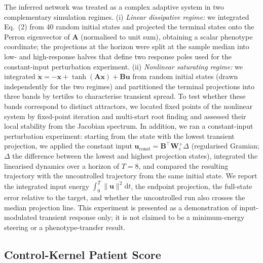 \documentclass[12pt]{article}
\begin{document}
The inferred network was treated as a complex adaptive system in two
complementary simulation regimes. (i) \emph{Linear dissipative regime:} we
integrated Eq.~(2) from 40 random initial states and projected the terminal
states onto the Perron eigenvector of $\mathbf{A}$ (normalised to unit
sum), obtaining a scalar phenotype coordinate; the projections at the
horizon were split at the sample median into low- and high-response halves
that define two response poles used for the constant-input perturbation
experiment. (ii) \emph{Nonlinear saturating regime:} we integrated
$\dot{\mathbf{x}} = -\mathbf{x} + \tanh(\mathbf{A}\mathbf{x}) +
\mathbf{B}\mathbf{u}$ from random initial states (drawn independently for
the two regimes) and partitioned the
terminal projections into three bands by tertiles to characterise transient
spread. To test whether these bands correspond to distinct attractors, we
located fixed points of the nonlinear system by fixed-point iteration and
multi-start root finding and assessed their local stability from the
Jacobian spectrum. In addition, we ran a constant-input perturbation
experiment: starting from the state with the lowest transient projection,
we applied the constant input $\mathbf{u}_{\mathrm{const}} =
\mathbf{B}^{\top}\mathbf{W}_c^{+}\Delta$ (regularised Gramian; $\Delta$
the difference between the lowest and highest projection states), integrated
the linearised dynamics over a horizon of $T = 8$, and compared the
resulting trajectory with the uncontrolled trajectory from the same initial
state. We report the integrated input energy $\int_0^T \|\mathbf{u}\|^2
\mathrm{d}t$, the endpoint projection, the full-state error relative to the
target, and whether the uncontrolled run also crosses the median projection
line. This experiment is presented as a demonstration of input-modulated
transient response only; it is not claimed to be a minimum-energy steering
or a phenotype-transfer result.

\subsection{Control-Kernel Patient Score}
\end{document}
